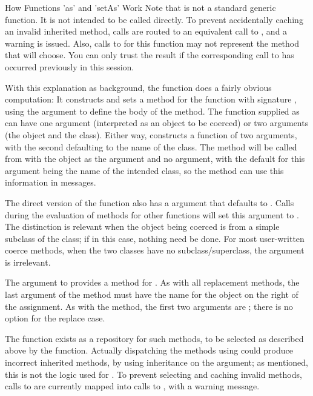 \begin{Section}{How Functions 'as' and 'setAs' Work}
Note that   is not a standard generic function.  It is
not intended to be called directly.  To prevent accidentally caching
an invalid inherited method, calls are routed to an equivalent call to
, and a warning is issued.  Also, calls to
 for this function may not represent the
method that  will choose.  You can only trust the result if
the corresponding call to  has occurred previously in this
session.

With this explanation as background, the function  does a
fairly obvious computation:  It constructs and sets a method for the function
 with signature , using the 
argument to define the body of the method.  The function supplied as
 can have one argument (interpreted as an object to be
coerced) or two arguments (the  object and the 
class).  Either way,  constructs a function of two
arguments, with the second defaulting to the name of the 
class.  The method will be called from  with the object
as the  argument and no  argument, with the default for this argument being the name of the intended
 class, so the method can use this information in messages.

The direct version of the  function also has a  argument that defaults to .
Calls during the evaluation of methods for other functions will set this argument to .
The distinction is relevant when the object being coerced is from a simple subclass of the  class; if  in this case, nothing need be done.
For most user-written coerce methods, when the two classes have no subclass/superclass, the  argument is irrelevant.

The  argument to  provides a method for
.
As with all replacement methods, the last argument of the method must
have the name  for the object on the right of the
assignment.
As with the  method, the first two arguments are
; there is no  option for the replace case.

The function  exists as a repository for
such methods, to be selected as described above by the 
function.  Actually dispatching the methods using
 could produce incorrect inherited methods, by using
inheritance on the
 argument; as mentioned, this is not the logic used for
.
To prevent selecting and caching invalid methods, calls to
 are
currently mapped into calls to , with a warning message.
\end{Section}

